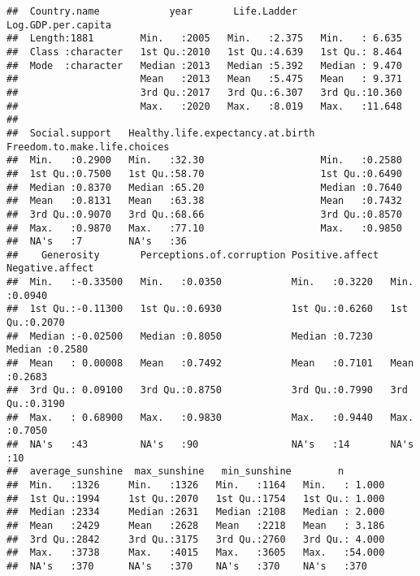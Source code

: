 \documentclass[
]{article}
\begin{document}
\begin{verbatim}
##  Country.name            year       Life.Ladder    Log.GDP.per.capita
##  Length:1881        Min.   :2005   Min.   :2.375   Min.   : 6.635    
##  Class :character   1st Qu.:2010   1st Qu.:4.639   1st Qu.: 8.464    
##  Mode  :character   Median :2013   Median :5.392   Median : 9.470    
##                     Mean   :2013   Mean   :5.475   Mean   : 9.371    
##                     3rd Qu.:2017   3rd Qu.:6.307   3rd Qu.:10.360    
##                     Max.   :2020   Max.   :8.019   Max.   :11.648    
##                                                                      
##  Social.support   Healthy.life.expectancy.at.birth Freedom.to.make.life.choices
##  Min.   :0.2900   Min.   :32.30                    Min.   :0.2580              
##  1st Qu.:0.7500   1st Qu.:58.70                    1st Qu.:0.6490              
##  Median :0.8370   Median :65.20                    Median :0.7640              
##  Mean   :0.8131   Mean   :63.38                    Mean   :0.7432              
##  3rd Qu.:0.9070   3rd Qu.:68.66                    3rd Qu.:0.8570              
##  Max.   :0.9870   Max.   :77.10                    Max.   :0.9850              
##  NA's   :7        NA's   :36                                                   
##    Generosity       Perceptions.of.corruption Positive.affect  Negative.affect 
##  Min.   :-0.33500   Min.   :0.0350            Min.   :0.3220   Min.   :0.0940  
##  1st Qu.:-0.11300   1st Qu.:0.6930            1st Qu.:0.6260   1st Qu.:0.2070  
##  Median :-0.02500   Median :0.8050            Median :0.7230   Median :0.2580  
##  Mean   : 0.00008   Mean   :0.7492            Mean   :0.7101   Mean   :0.2683  
##  3rd Qu.: 0.09100   3rd Qu.:0.8750            3rd Qu.:0.7990   3rd Qu.:0.3190  
##  Max.   : 0.68900   Max.   :0.9830            Max.   :0.9440   Max.   :0.7050  
##  NA's   :43         NA's   :90                NA's   :14       NA's   :10      
##  average_sunshine  max_sunshine   min_sunshine        n         
##  Min.   :1326     Min.   :1326   Min.   :1164   Min.   : 1.000  
##  1st Qu.:1994     1st Qu.:2070   1st Qu.:1754   1st Qu.: 1.000  
##  Median :2334     Median :2631   Median :2108   Median : 2.000  
##  Mean   :2429     Mean   :2628   Mean   :2218   Mean   : 3.186  
##  3rd Qu.:2842     3rd Qu.:3175   3rd Qu.:2760   3rd Qu.: 4.000  
##  Max.   :3738     Max.   :4015   Max.   :3605   Max.   :54.000  
##  NA's   :370      NA's   :370    NA's   :370    NA's   :370
\end{verbatim}
\end{document}
